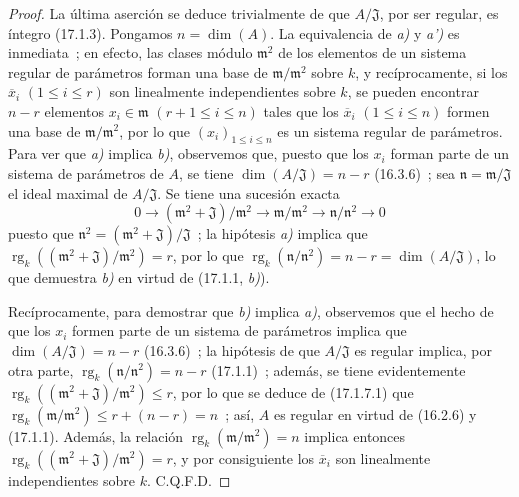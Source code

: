 \begin{proof}
La última aserción se deduce trivialmente de que $A/\mathfrak{J}$,
por ser regular, es íntegro (17.1.3). Pongamos $n=\dim(A)$. La equivalencia de \emph{a)}
y \emph{a')} es inmediata~; en efecto, las clases módulo $\mathfrak{m}^2$ de los elementos
de un sistema regular de parámetros forman una base de
$\mathfrak{m}/\mathfrak{m}^2$ sobre $k$, y recíprocamente, si los
$\overline{x}_i$ $(1\leq i\leq r)$ son linealmente independientes sobre $k$, se
pueden encontrar $n-r$ elementos $x_i\in\mathfrak{m}$ $(r+1\leq i\leq n)$ tales que
los $\overline{x}_i$ $(1\leq i\leq n)$ formen una base de
$\mathfrak{m}/\mathfrak{m}^2$, por lo que $(x_i)_{1\leq i\leq n}$ es un sistema
regular de parámetros. Para ver que \emph{a)} implica \emph{b)}, observemos que, puesto que
los $x_i$ forman parte de un sistema de parámetros de $A$, se tiene
$\dim(A/\mathfrak{J})=n-r$ (16.3.6)~; sea
$\mathfrak{n}=\mathfrak{m}/\mathfrak{J}$ el ideal maximal de
$A/\mathfrak{J}$. Se tiene una sucesión exacta
\begin{equation}
\label{0.17.1.7.1-es}
\tag{17.1.7.1}
  0\longrightarrow(\mathfrak{m}^2+\mathfrak{J})/\mathfrak{m}^2
  \longrightarrow\mathfrak{m}/\mathfrak{m}^2
  \longrightarrow\mathfrak{n}/\mathfrak{n}^2\longrightarrow0
\end{equation}
puesto que $\mathfrak{n}^2=(\mathfrak{m}^2+\mathfrak{J})/\mathfrak{J}$~;
la hipótesis \emph{a)} implica que
$\operatorname{rg}_k((\mathfrak{m}^2+\mathfrak{J})/\mathfrak{m}^2)=r$, por lo que
$\operatorname{rg}_k(\mathfrak{n}/\mathfrak{n}^2)=n-r
=\dim(A/\mathfrak{J})$, lo que demuestra \emph{b)} en virtud de (17.1.1, \emph{b)}).

Recíprocamente, para demostrar que \emph{b)} implica \emph{a)}, observemos que el hecho de que los $x_i$
formen parte de un sistema de parámetros implica que
$\dim(A/\mathfrak{J})=n-r$ (16.3.6)~; la hipótesis de que $A/\mathfrak{J}$ es
regular implica, por otra parte,
$\operatorname{rg}_k(\mathfrak{n}/\mathfrak{n}^2)=n-r$ (17.1.1)~; además,
se tiene evidentemente
$\operatorname{rg}_k((\mathfrak{m}^2+\mathfrak{J})/\mathfrak{m}^2)\leq r$,
por lo que se deduce de (17.1.7.1) que
$\operatorname{rg}_k(\mathfrak{m}/\mathfrak{m}^2)\leq r+(n-r)=n$~; así, $A$
es regular en virtud de (16.2.6) y (17.1.1). Además, la relación
$\operatorname{rg}_k(\mathfrak{m}/\mathfrak{m}^2)=n$ implica entonces
$\operatorname{rg}_k((\mathfrak{m}^2+\mathfrak{J})/\mathfrak{m}^2)=r$, y por
consiguiente los $\overline{x}_i$ son linealmente independientes sobre $k$. C.Q.F.D.
\end{proof}

